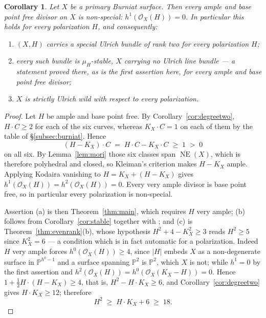\documentclass[10pt,a4paper]{amsart}
\newtheorem{corollary}[theorem]{Corollary}
\newcommand{\OO}{\mathcal{O}}
\newcommand{\PP}{\mathbb{P}}
\newcommand{\NE}{\overline{\operatorname{NE}}}
\begin{document}
\begin{corollary}\label{cor:burniat-nonspecial}
Let $X$ be a primary Burniat surface. Then \emph{every} ample and base point free divisor on $X$ is non-special: $h^1(\OO_X(H))=0$. In particular this holds for every polarization $H$, and consequently:
\begin{enumerate}[label=\textup{(\alph*)}]
\item $(X,H)$ carries a special Ulrich bundle of rank two for every polarization $H$;
\item every such bundle is $\mu_H$-stable, $X$ carrying no Ulrich line bundle \cite[Thm.~5.5]{Cho26} --- a statement proved there, as is the first assertion here, for every ample and base point free divisor;
\item $X$ is strictly Ulrich wild with respect to \emph{every} polarization.
\end{enumerate}
\end{corollary}

\begin{proof}
Let $H$ be ample and base point free. By Corollary~\ref{cor:degreetwo}, $H\cdot C\ge2$ for each of the six curves, whereas $K_X\cdot C=1$ on each of them by the table of \S\ref{subsec:burniat}. Hence
\[
(H-K_X)\cdot C\;=\;H\cdot C-K_X\cdot C\;\ge\;1\;>\;0
\]
on all six. By Lemma~\ref{lem:mori} those six classes span $\NE(X)$, which is therefore polyhedral and closed, so Kleiman's criterion makes $H-K_X$ ample. Applying Kodaira vanishing to $H=K_X+(H-K_X)$ gives $h^1(\OO_X(H))=h^2(\OO_X(H))=0$. Every very ample divisor is base point free, so in particular every polarization is non-special.

Assertion (a) is then Theorem~\ref{thm:main}, which requires $H$ very ample; (b) follows from Corollary~\ref{cor:stable} together with \cite[Thm.~5.5]{Cho26}; and (c) is Theorem~\ref{thm:evenrank}(b), whose hypothesis $H^2+4-K_X^2\ge3$ reads $H^2\ge5$ since $K_X^2=6$ --- a condition which is in fact automatic for a polarization. Indeed $H$ very ample forces $h^0(\OO_X(H))\ge4$, since $|H|$ embeds $X$ as a non-degenerate surface in $\PP^{h^0-1}$ and a surface spanning $\PP^2$ is $\PP^2$, which $X$ is not; while $h^1=0$ by the first assertion and $h^2(\OO_X(H))=h^0(\OO_X(K_X-H))=0$. Hence $1+\tfrac12H\cdot(H-K_X)\ge4$, that is, $H^2-H\cdot K_X\ge6$, and Corollary~\ref{cor:degreetwo} gives $H\cdot K_X\ge12$; therefore
\[
H^2\;\ge\;H\cdot K_X+6\;\ge\;18 .
\]
\end{proof}
\end{document}
